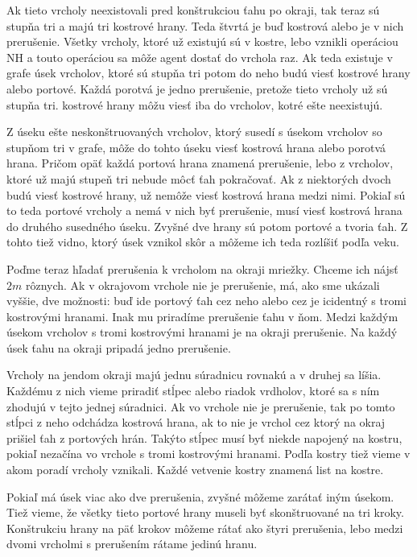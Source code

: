 Ak tieto vrcholy neexistovali pred konštrukciou
ťahu po okraji, tak teraz sú stupňa tri a majú tri kostrové hrany. Teda
štvrtá je buď kostrová alebo je v nich prerušenie.
Všetky vrcholy, ktoré už existujú sú v kostre, lebo vznikli operáciou NH a
touto operáciou sa môže agent dostať do vrchola raz. Ak teda existuje v
grafe úsek
vrcholov, ktoré sú stupňa tri potom do neho budú viesť kostrové hrany alebo
portové. Každá porotvá je jedno prerušenie, pretože tieto vrcholy už sú
stupňa tri. kostrové hrany môžu viesť iba do vrcholov, kotré ešte
neexistujú.

Z úseku ešte neskonštruovaných vrcholov, ktorý susedí s úsekom vrcholov so
stupňom tri v grafe, môže do tohto úseku viesť kostrová hrana alebo porotvá
hrana. Pričom opäť každá portová hrana znamená prerušenie, lebo z vrcholov,
ktoré už majú stupeň tri nebude môcť ťah pokračovať. Ak z niektorých dvoch
budú viesť kostrové hrany, už nemôže viesť kostrová hrana medzi nimi. Pokiaľ
sú to teda portové vrcholy a nemá v nich byť prerušenie, musí viesť kostrová
hrana do druhého susedného úseku. Zvyšné dve hrany sú potom portové a tvoria
ťah. Z tohto tiež vidno, ktorý úsek vznikol skôr a môžeme ich teda rozlíšiť
podľa veku.

Poďme teraz hľadať prerušenia k vrcholom na  okraji mriežky. 
Chceme ich nájsť $2m$ rôznych. Ak
v okrajovom vrchole nie je prerušenie, má, ako sme ukázali vyššie, 
dve možnosti: 
buď ide portový ťah cez neho alebo cez je icidentný s tromi kostrovými
hranami. Inak mu priradíme prerušenie ťahu v ňom. Medzi každým úsekom
vrcholov s tromi kostrovými hranami je na okraji prerušenie. Na každý úsek
ťahu na okraji pripadá jedno prerušenie.

Vrcholy na jendom okraji majú jednu súradnicu rovnakú a v druhej sa líšia.
Každému z nich vieme priradiť stĺpec alebo riadok vrdholov, ktoré sa s ním
zhodujú v tejto jednej súradnici. Ak vo vrchole nie je prerušenie, tak po
tomto stĺpci z neho odchádza kostrová hrana, ak to nie je vrchol cez ktorý na
okraj prišiel ťah z portových hrán. Takýto stĺpec musí byť niekde napojený
na kostru, pokiaľ nezačína vo vrchole s tromi kostrovými hranami. Podľa
kostry tiež vieme v akom poradí vrcholy vznikali. Každé vetvenie kostry
znamená list na kostre.

Pokiaľ má úsek viac ako dve prerušenia, zvyšné môžeme zarátať iným úsekom.
Tiež vieme, že všetky tieto portové hrany museli byť skonštruované na tri kroky.
Konštrukciu hrany na päť krokov môžeme rátať ako štyri prerušenia, lebo
medzi dvomi vrcholmi s prerušením rátame jedinú hranu.

